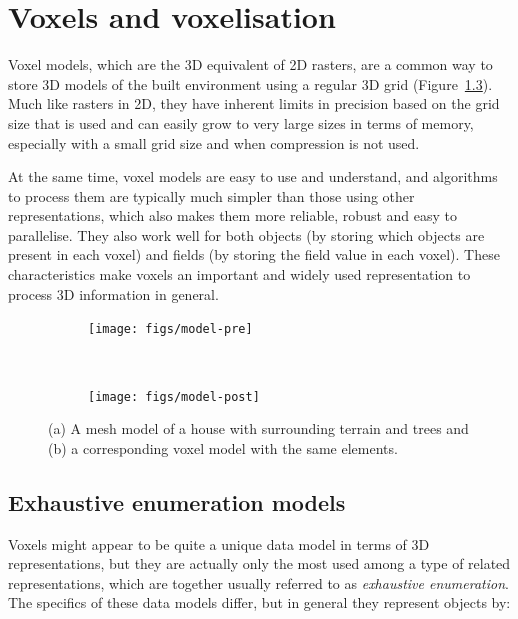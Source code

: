 
\setchapterpreamble[u]{\margintoc}

\graphicspath{{voxels/}}

\chapter{Voxels and voxelisation}%
\label{chap:voxels}

Voxel models, which are the 3D equivalent of 2D rasters, are a common way to store 3D models of the built environment using a regular 3D grid (Figure~\ref{fig:model}).
Much like rasters in 2D, they have inherent limits in precision based on the grid size that is used and can easily grow to very large sizes in terms of memory, especially with a small grid size and when compression is not used.

At the same time, voxel models are easy to use and understand, and algorithms to process them are typically much simpler than those using other representations, which also makes them more reliable, robust and easy to parallelise.
They also work well for both objects (by storing which objects are present in each voxel) and fields (by storing the field value in each voxel).
These characteristics make voxels an important and widely used representation to process 3D information in general.

\begin{figure}[htbp]
\centering
\begin{subfigure}[b]{\linewidth}
\texttt{[image: figs/model-pre]}
\caption{}%
\label{subfig:model-pre}
\end{subfigure}
\\
\begin{subfigure}[b]{\linewidth}
\texttt{[image: figs/model-post]}
\caption{}%
\label{subfig:model-post}
\end{subfigure}
\caption[A mesh model and a corresponding voxel model]{(a) A mesh model of a house with surrounding terrain and trees and (b) a corresponding voxel model with the same elements.}%
\label{fig:model}
\end{figure}

\section{Exhaustive enumeration models}

Voxels might appear to be quite a unique data model in terms of 3D representations, but they are actually only the most used among a type of related representations, which are together usually referred to as \emph{exhaustive enumeration}.
The specifics of these data models differ, but in general they represent objects by:

